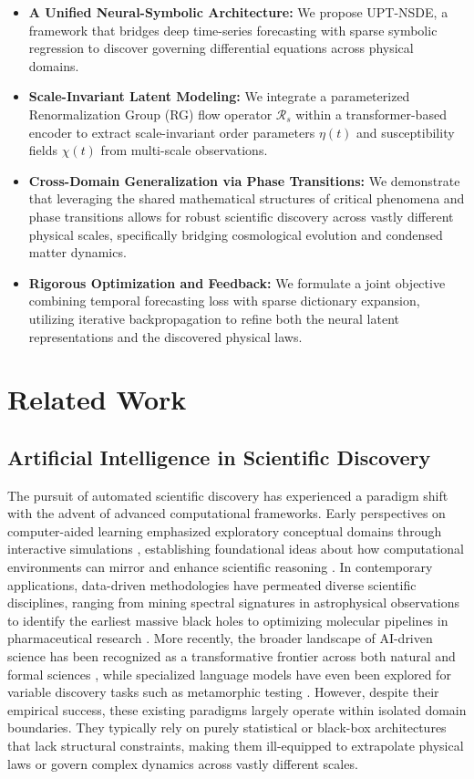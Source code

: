 \documentclass[10pt,twocolumn]{article}
\begin{document}
\begin{itemize}
    \item \textbf{A Unified Neural-Symbolic Architecture:} We propose UPT-NSDE, a framework that bridges deep time-series forecasting with sparse symbolic regression to discover governing differential equations across physical domains.
    \item \textbf{Scale-Invariant Latent Modeling:} We integrate a parameterized Renormalization Group (RG) flow operator $\mathcal{R}_s$ within a transformer-based encoder to extract scale-invariant order parameters $\eta(t)$ and susceptibility fields $\chi(t)$ from multi-scale observations.
    \item \textbf{Cross-Domain Generalization via Phase Transitions:} We demonstrate that leveraging the shared mathematical structures of critical phenomena and phase transitions allows for robust scientific discovery across vastly different physical scales, specifically bridging cosmological evolution and condensed matter dynamics.
    \item \textbf{Rigorous Optimization and Feedback:} We formulate a joint objective combining temporal forecasting loss with sparse dictionary expansion, utilizing iterative backpropagation to refine both the neural latent representations and the discovered physical laws.
\end{itemize}

\section{Related Work}
\subsection{Artificial Intelligence in Scientific Discovery}
The pursuit of automated scientific discovery has experienced a paradigm shift with the advent of advanced computational frameworks. Early perspectives on computer-aided learning emphasized exploratory conceptual domains through interactive simulations \cite{ref_1}, establishing foundational ideas about how computational environments can mirror and enhance scientific reasoning \cite{ref_3}. In contemporary applications, data-driven methodologies have permeated diverse scientific disciplines, ranging from mining spectral signatures in astrophysical observations to identify the earliest massive black holes \cite{ref_2} to optimizing molecular pipelines in pharmaceutical research \cite{ref_4}. More recently, the broader landscape of AI-driven science has been recognized as a transformative frontier across both natural and formal sciences \cite{target_ref}, while specialized language models have even been explored for variable discovery tasks such as metamorphic testing \cite{ref_5}. However, despite their empirical success, these existing paradigms largely operate within isolated domain boundaries. They typically rely on purely statistical or black-box architectures that lack structural constraints, making them ill-equipped to extrapolate physical laws or govern complex dynamics across vastly different scales.
\end{document}
